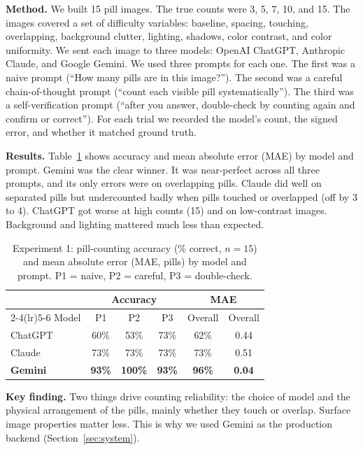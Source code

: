 \documentclass[10pt,twocolumn]{article}
\begin{document}
\textbf{Method.} We built 15 pill images. The true counts were 3, 5, 7, 10, and 15.
The images covered a set of difficulty variables: baseline, spacing, touching,
overlapping, background clutter, lighting, shadows, color contrast, and color
uniformity. We sent each image to three models: OpenAI ChatGPT, Anthropic Claude,
and Google Gemini. We used three prompts for each one. The first was a naive prompt
(``How many pills are in this image?''). The second was a careful chain-of-thought
prompt (``count each visible pill systematically''). The third was a
self-verification prompt (``after you answer, double-check by counting again and
confirm or correct''). For each trial we recorded the model's count, the signed
error, and whether it matched ground truth.

\textbf{Results.} Table~\ref{tab:exp1} shows accuracy and mean absolute error (MAE)
by model and prompt. Gemini was the clear winner. It was near-perfect across all
three prompts, and its only errors were on overlapping pills. Claude did well on
separated pills but undercounted badly when pills touched or overlapped (off by 3 to
4). ChatGPT got worse at high counts (15) and on low-contrast images. Background and
lighting mattered much less than expected.

\begin{table}[H]
\centering
\caption{Experiment 1: pill-counting accuracy (\% correct, $n{=}15$) and mean
absolute error (MAE, pills) by model and prompt. P1 = naive, P2 = careful,
P3 = double-check.}
\label{tab:exp1}
\small
\begin{tabular}{@{}lccccc@{}}
\toprule
& \multicolumn{3}{c}{Accuracy} & \multicolumn{2}{c}{MAE}\\
\cmidrule(lr){2-4}\cmidrule(lr){5-6}
Model & P1 & P2 & P3 & Overall & Overall\\
\midrule
ChatGPT & 60\% & 53\% & 73\% & 62\% & 0.44\\
Claude  & 73\% & 73\% & 73\% & 73\% & 0.51\\
\textbf{Gemini}  & \textbf{93\%} & \textbf{100\%} & \textbf{93\%} & \textbf{96\%} & \textbf{0.04}\\
\bottomrule
\end{tabular}
\end{table}

\textbf{Key finding.} Two things drive counting reliability: the choice of model and
the physical arrangement of the pills, mainly whether they touch or overlap. Surface
image properties matter less. This is why we used Gemini as the production backend
(Section~\ref{sec:system}).
\end{document}
